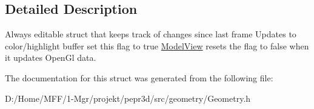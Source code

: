 \subsection{Detailed Description}
Always editable struct that keeps track of changes since last frame Updates to color/highlight buffer set this flag to true \mbox{\hyperlink{classpepr3d_1_1_model_view}{Model\+View}} resets the flag to false when it updates Open\+Gl data. 

The documentation for this struct was generated from the following file\+:\begin{DoxyCompactItemize}
\item 
D\+:/\+Home/\+M\+F\+F/1-\/\+Mgr/projekt/pepr3d/src/geometry/Geometry.\+h\end{DoxyCompactItemize}
